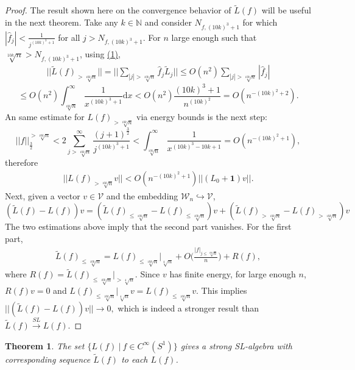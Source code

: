 \documentclass[twoside,11pt,titlepage]{amsart}
\renewcommand{\=}[1]{\stackrel{#1}{=}} %
\newtheorem{thm}{Theorem}[section]
\theoremstyle{definition}
\theoremstyle{remark}
\begin{document}
\begin{proof}
The result shown here on the convergence behavior of $\widetilde{L}(f)$ will be useful in the next theorem. Take any $k \in \mathbb{N}$ and consider $N_{f,(10k)^3+1}$ for which $|\hat{f}_j|<\frac{1}{j^{(10k)^3+1}}$ for all $j>N_{f,(10k)^3+1}$. For $n$ large enough such that $\sqrt[10k]{n}>N_{f,(10k)^3+1}$, using \hyperref[eq1]{(1)},
\begin{align}\label{eq2}
||\widetilde{L}(f)_{>\sqrt[10k]{n}}||=||\sum_{|j|>\sqrt[10k]{n}} \hat{f}_j\widetilde{L}_j|| \le O(n^2)\sum_{|j|>\sqrt[10k]{n}} |\hat{f}_j|
\end{align}
$$\le O(n^2)\int_{\sqrt[10k]{n}}^\infty \frac{1}{x^{(10k)^3+1}} \text{d}x < O(n^2)\frac{(10k)^3+1}{n^{(10k)^2}}=O(n^{-(10k)^2+2}).$$
An same estimate for $L(f)_{>\sqrt[10k]{n}}$ via energy bounds is the next step:
$$||f||_\frac{3}{2}^{>\sqrt[10k]{n}}<2\sum_{j>\sqrt[10k]{n}}^{\infty} \frac{(j+1)^\frac{3}{2}}{j^{(10k)^3+1}}<\int_{\sqrt[10k]{n}}^\infty \frac{1}{x^{(10k)^3-10k+1}}=O(n^{-(10k)^2+1}),$$
therefore
\begin{align}\label{eq3}
||L(f)_{>\sqrt[10k]{n}}v|| <O(n^{-(10k)^2+1})||(L_0+\textbf{1})v||.
\end{align}
Next, given a vector $v \in \mathcal{V}$ and the embedding $\mathcal{W}_n \hookrightarrow \mathcal{V}$,
$$(\widetilde{L}(f)-L(f))v= (\widetilde{L}(f)_{\le \sqrt[10k]{n}}-L(f)_{\le \sqrt[10k]{n}}) v + (\widetilde{L}(f)_{>\sqrt[10k]{n}}-L(f)_{>\sqrt[10k]{n}}) v$$
The two estimations above imply that the second part vanishes. For the first part,
\begin{align}\label{eq4}
\widetilde{L}(f)_{\le \sqrt[10k]{n}}=L(f)_{\le \sqrt[10k]{n}}|_{\sqrt[4]{n}}+O\Big(\frac{|f|_{j \le \sqrt[10k]{n}}}{n} \Big)+R(f),
\end{align}
where $R(f)=\widetilde{L}(f)_{\le \sqrt[10k]{n}}|_{>\sqrt[4]{n}}$. Since $v$ has finite energy, for large enough $n$, $R(f)v=0$ and $L(f)_{\le \sqrt[10k]{n}}|_{\sqrt[4]{n}}v=L(f)_{\le \sqrt[10k]{n}}v$. This implies $||(\widetilde{L}(f)-L(f))v||\to 0,$ which is indeed a stronger result than $\widetilde{L}(f) \xrightarrow{SL} L(f)$.
\end{proof}
\begin{thm}\label{thm4.6}
The set $\{L(f) \ | \ f \in C^{\infty}(S^1)\}$ gives a strong SL-algebra with corresponding sequence $\widetilde{L}(f)$ to each $L(f)$.
\end{thm}
\end{document}
